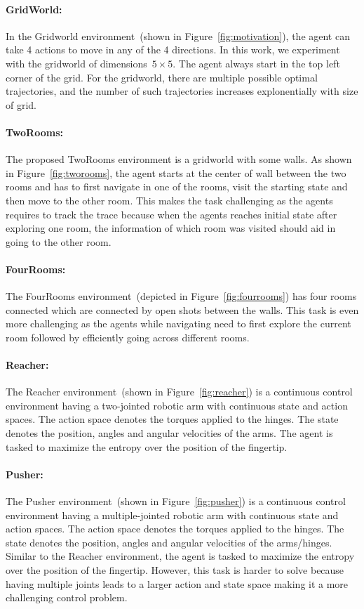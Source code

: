 \documentclass{article}
\theoremstyle{plain}
\theoremstyle{definition}
\theoremstyle{remark}
\begin{document}
\paragraph{GridWorld:} In the Gridworld environment~(shown in Figure~\ref{fig:motivation}), the agent can take 4 actions to move in any of the 4 directions. In this work, we experiment with the gridworld of dimensions~$5\times5$. The agent always start in the top left corner of the grid. For the gridworld, there are multiple possible optimal trajectories, and the number of such trajectories increases explonentially with size of grid. 

\paragraph{TwoRooms:} The proposed TwoRooms environment is a gridworld with some walls. As shown in Figure~\ref{fig:tworooms}, the agent starts at the center of wall between the two rooms and has to first navigate in one of the rooms, visit the starting state and then move to the other room. This makes the task challenging as the agents requires to track the trace because when the agents reaches initial state after exploring one room, the information of which room was visited should aid in going to the other room.

\paragraph{FourRooms:}
The FourRooms environment~(depicted in Figure~\ref{fig:fourrooms}) has four rooms connected which are connected by open shots between the walls. This task is even more challenging as the agents while navigating need to first explore the current room followed by efficiently going across different rooms. 

\paragraph{Reacher:}
The Reacher environment~(shown in Figure~\ref{fig:reacher}) is a continuous control environment having a two-jointed robotic arm with continuous state and action spaces. The action space denotes the torques applied to the hinges. 
The state denotes the position, angles and angular velocities of the arms. 
The agent is tasked to maximize the entropy over the position of the fingertip.

\paragraph{Pusher:}
The Pusher environment~(shown in Figure~\ref{fig:pusher}) is a continuous control environment having a multiple-jointed robotic arm with continuous state and action spaces. The action space denotes the torques applied to the hinges. 
The state denotes the position, angles and angular velocities of the arms/hinges. 
Similar to the Reacher environment, the agent is tasked to maximize the entropy over the position of the fingertip.
However, this task is harder to solve because having multiple joints leads to a larger action and state space making it a more challenging control problem.
\end{document}
